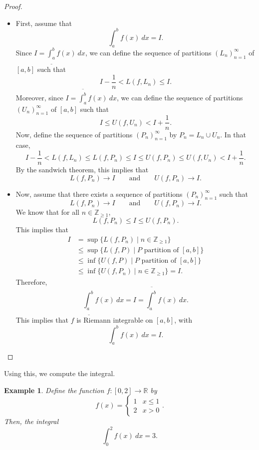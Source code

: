 \documentclass[a4paper, openany]{memoir}
\theoremstyle{definition}
\theoremstyle{plain}
\newtheorem{example}[definition]{Example}
\begin{document}
\begin{proof}
\hspace*{0pt}
\begin{itemize}
    \item First, assume that 
    \[\int_a^b f(x) \ dx = I.\]
    Since $I = \underline{\int_a^b} f(x) \ dx$, we can define the sequence of partitions $(L_n)_{n=1}^\infty$ of $[a, b]$ such that
    \[I - \frac{1}{n} < L(f, L_n) \leqslant I.\]
    Moreover, since $I = \overline{\int_a^b} f(x) \ dx$, we can define the sequence of partitions $(U_n)_{n=1}^\infty$ of $[a, b]$ such that
    \[I \leqslant U(f, U_n) < I + \frac{1}{n}.\]
    Now, define the sequence of partitions $(P_n)_{n=1}^\infty$ by $P_n = L_n \cup U_n$. In that case,
    \[I - \frac{1}{n} < L(f, L_n) \leqslant L(f, P_n) \leqslant I \leqslant U(f, P_n) \leqslant U(f, U_n) < I + \frac{1}{n}.\]
    By the sandwich theorem, this implies that
    \[L(f, P_n) \to I \qquad \text{and} \qquad U(f, P_n) \to I.\]
    
    \item Now, assume that there exists a sequence of partitions $(P_n)_{n=1}^\infty$ such that
    \[L(f, P_n) \to I \qquad \text{and} \qquad U(f, P_n) \to I.\]
    We know that for all $n \in \mathbb{Z}_{\geqslant 1}$, 
    \[L(f, P_n) \leqslant I \leqslant U(f, P_n).\]
    This implies that
    \begin{align*}
        I &= \sup \{L(f, P_n) \mid n \in \mathbb{Z}_{\geqslant 1}\} \\
        &\leqslant \sup \{L(f, P) \mid P \text{ partition of } [a, b]\} \\
        &\leqslant \inf \{U(f, P) \mid P \text{ partition of } [a, b]\} \\
        &\leqslant \inf \{U(f, P_n) \mid n \in \mathbb{Z}_{\geqslant 1}\} = I.
    \end{align*}
    Therefore,
    \[\underline{\int_a^b} f(x) \ dx = I = \overline{\int_a^b} f(x) \ dx.\]
    This implies that $f$ is Riemann integrable on $[a, b]$, with
    \[\int_a^b f(x) \ dx = I.\]
\end{itemize}
\end{proof}
\noindent Using this, we compute the integral.
\begin{example}
Define the function $f: [0, 2] \to \mathbb{R}$ by
\[f(x) = \begin{cases}
1 & x \leqslant 1 \\
2 & x > 0
\end{cases}.\]
Then, the integral
\[\int_0^2 f(x) \ dx = 3.\]
\end{example}
\end{document}

